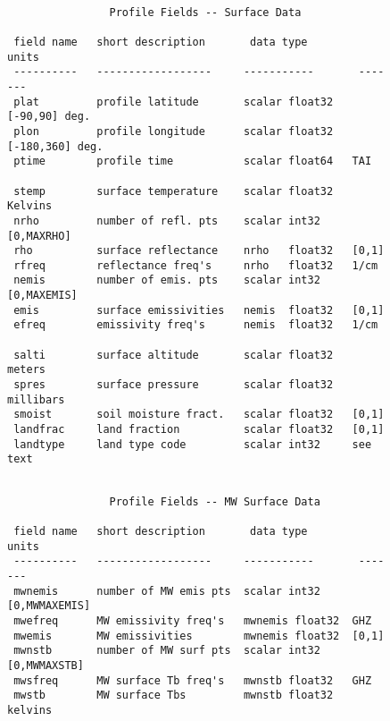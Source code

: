 \documentclass[12pt]{article}
\begin{document}
\begin{figure}
{\small
\begin{verbatim}

                Profile Fields -- Surface Data
  
 field name   short description       data type         units
 ----------   ------------------     -----------       -------
 plat         profile latitude       scalar float32   [-90,90] deg.
 plon         profile longitude      scalar float32   [-180,360] deg.
 ptime        profile time           scalar float64   TAI  

 stemp        surface temperature    scalar float32   Kelvins
 nrho         number of refl. pts    scalar int32     [0,MAXRHO]
 rho          surface reflectance    nrho   float32   [0,1]
 rfreq        reflectance freq's     nrho   float32   1/cm
 nemis        number of emis. pts    scalar int32     [0,MAXEMIS]
 emis         surface emissivities   nemis  float32   [0,1]
 efreq        emissivity freq's      nemis  float32   1/cm

 salti        surface altitude       scalar float32   meters
 spres        surface pressure       scalar float32   millibars
 smoist       soil moisture fract.   scalar float32   [0,1]
 landfrac     land fraction          scalar float32   [0,1]
 landtype     land type code         scalar int32     see text

\end{verbatim}
}
\end{figure}
\begin{figure}
{\small
\begin{verbatim}

                Profile Fields -- MW Surface Data

 field name   short description       data type         units
 ----------   ------------------     -----------       -------
 mwnemis      number of MW emis pts  scalar int32     [0,MWMAXEMIS]
 mwefreq      MW emissivity freq's   mwnemis float32  GHZ
 mwemis       MW emissivities        mwnemis float32  [0,1]
 mwnstb       number of MW surf pts  scalar int32     [0,MWMAXSTB]
 mwsfreq      MW surface Tb freq's   mwnstb float32   GHZ
 mwstb        MW surface Tbs         mwnstb float32   kelvins

\end{verbatim}
}
\end{figure}
\end{document}
